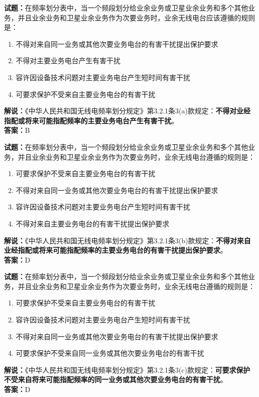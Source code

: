 \documentclass{ctexbook}
\begin{document}
\bigskip




\noindent\textbf{试题：}在频率划分表中，当一个频段划分给业余业务或卫星业余业务和多个其他业务，并且业余业务和卫星业余业务作为次要业务时，业余无线电台应该遵循的规则是：
\begin{enumerate}[leftmargin=3em]
\item 不得对来自同一业务或其他次要业务电台的有害干扰提出保护要求
\item 不得对主要业务电台产生有害干扰
\item 容许因设备技术问题对主要业务电台产生短时间有害干扰
\item 可要求保护不受来自主要业务电台的有害干扰
\end{enumerate}
\noindent\textbf{解说：}《中华人民共和国无线电频率划分规定》第3.2.1条3(a)款规定：\textbf{不得对业经指配或将来可能指配频率的主要业务电台产生有害干扰}。\\
\textbf{答案：}B

\bigskip




\noindent\textbf{试题：}在频率划分表中，当一个频段划分给业余业务或卫星业余业务和多个其他业务，并且业余业务和卫星业余业务作为次要业务时，业余无线电台遵循的规则是：
\begin{enumerate}[leftmargin=3em]
\item 可要求保护不受来自主要业务电台的有害干扰
\item 不得对来自同一业务或其他次要业务电台的有害干扰提出保护要求
\item 容许因设备技术问题对主要业务电台产生短时间有害干扰
\item 不得对来自主要业务电台的有害干扰提出保护要求
\end{enumerate}
\noindent\textbf{解说：}《中华人民共和国无线电频率划分规定》第3.2.1条3(b)款规定：\textbf{不得对来自业经指配或将来可能指配频率的主要业务电台的有害干扰提出保护要求}。\\\textbf{答案：}D

\bigskip




\noindent\textbf{试题：}在频率划分表中，当一个频段划分给业余业务或卫星业余业务和多个其他业务，并且业余业务和卫星业余业务作为次要业务时，业余无线电台遵循的规则是：
\begin{enumerate}[leftmargin=3em]
\item 可要求保护不受来自主要业务电台的有害干扰
\item 容许因设备技术问题对主要业务电台产生短时间有害干扰
\item 不得对来自同一业务或其他次要业务电台的有害干扰提出保护要求
\item 可要求保护不受来自同一业务或其他次要业务电台的有害干扰
\end{enumerate}
\noindent\textbf{解说：}《中华人民共和国无线电频率划分规定》第3.2.1条3(c)款规定：\textbf{可要求保护不受来自将来可能指配频率的同一业务或其他次要业务电台的有害干扰}。\\\textbf{答案：}D
\end{document}

